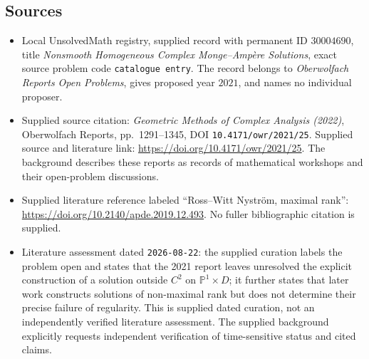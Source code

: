 \documentclass[11pt]{article}
\begin{document}
\subsection{Sources}
\begin{itemize}
\item Local UnsolvedMath registry, supplied record with permanent ID \(30004690\), title \emph{Nonsmooth Homogeneous Complex Monge--Amp\`ere Solutions}, exact source problem code \texttt{catalogue entry}. The record belongs to \emph{Oberwolfach Reports Open Problems}, gives proposed year \(2021\), and names no individual proposer.
\item Supplied source citation: \emph{Geometric Methods of Complex Analysis (2022)}, Oberwolfach Reports, pp.~1291--1345, DOI \texttt{10.4171/owr/2021/25}. Supplied source and literature link: \url{https://doi.org/10.4171/owr/2021/25}. The background describes these reports as records of mathematical workshops and their open-problem discussions.
\item Supplied literature reference labeled ``Ross--Witt Nystr\"om, maximal rank'': \url{https://doi.org/10.2140/apde.2019.12.493}. No fuller bibliographic citation is supplied.
\item Literature assessment dated \texttt{2026-08-22}: the supplied curation labels the problem open and states that the 2021 report leaves unresolved the explicit construction of a solution outside \(C^{2}\) on \(\mathbb{P}^{1}\times D\); it further states that later work constructs solutions of non-maximal rank but does not determine their precise failure of regularity. This is supplied dated curation, not an independently verified literature assessment. The supplied background explicitly requests independent verification of time-sensitive status and cited claims.
\end{itemize}
\end{document}
